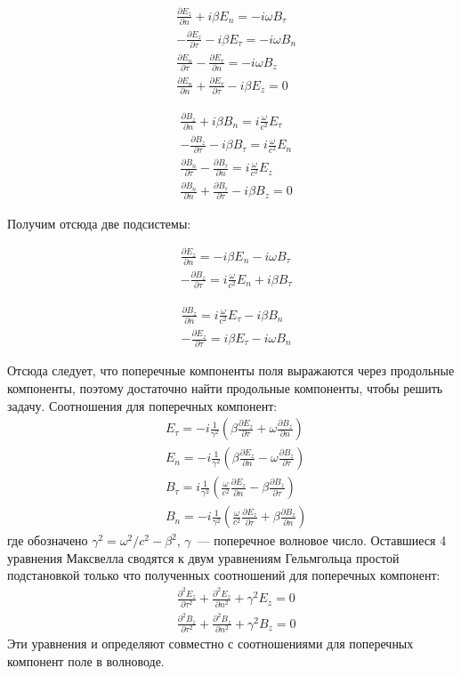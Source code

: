 \documentclass[a4paper,14pt]{extreport} %
\newcommand{\dff}[2]{\frac{\partial #1}{\partial #2}}
\newcommand{\dfs}[2]{\frac{\partial^2 #1}{\partial #2^2}}
\begin{document}
	\parbox{0.5\textwidth}{
		\begin{align*}
		& \dff{E_z}{n} + i \beta E_n = - i \omega B_\tau \\
		& - \dff{E_z}{\tau} - i \beta E_\tau = - i \omega B_n \\
		& \dff{E_n}{\tau} - \dff{E_\tau}{n} = - i \omega B_z \\
		& \dff{E_n}{n} + \dff{E_\tau}{\tau} - i \beta E_z = 0
		\end{align*}
	}\parbox{0.5\textwidth}{
		\begin{align*}
		& \dff{B_z}{n} + i \beta B_n = i \frac{\omega}{c^2} E_\tau \\
		& - \dff{B_z}{\tau} - i \beta B_\tau = i \frac{\omega}{c^2} E_n \\
		& \dff{B_n}{\tau} - \dff{B_\tau}{n} = i \frac{\omega}{c^2} E_z \\
		& \dff{B_n}{n} + \dff{B_\tau}{\tau} - i \beta B_z = 0
		\end{align*}
	}
	Получим отсюда две подсистемы:
	
	\parbox{0.5\textwidth}{
		\begin{align*}
		& \dff{E_z}{n} = - i \beta E_n - i \omega B_\tau \\
		& - \dff{B_z}{\tau} = i \frac{\omega}{c^2} E_n + i \beta B_\tau
		\end{align*}
	}\parbox{0.5\textwidth}{
		\begin{align*}
		& \dff{B_z}{n} = i \frac{\omega}{c^2} E_\tau - i \beta B_n\\
		& - \dff{E_z}{\tau} = i \beta E_\tau - i \omega B_n
		\end{align*}
	}
	Отсюда следует, что поперечные компоненты поля выражаются через продольные компоненты, поэтому достаточно найти продольные компоненты, чтобы решить задачу. Соотношения для поперечных компонент:
	\begin{align*}
		& {E}_\tau = - i \frac{1}{\gamma^2}\left(\beta\dff{E_z}{\tau} + \omega \dff{B_z}{n}\right) \\
		& {E}_n = - i \frac{1}{\gamma^2}\left(\beta\dff{E_z}{n} - \omega \dff{B_z}{\tau}\right) \\
		& {B}_\tau = i \frac{1}{\gamma^2}\left(\frac{\omega}{c^2} \dff{E_z}{n} - \beta\dff{B_z}{\tau}\right) \\
		& {B}_n = - i \frac{1}{\gamma^2}\left(\frac{\omega}{c^2}\dff{E_z}{\tau} + \beta \dff{B_z}{n}\right)
	\end{align*}
	где обозначено $\gamma^2 = \omega^2/c^2 - \beta^2$, $\gamma$~--- поперечное волновое число. Оставшиеся 4 уравнения Максвелла сводятся к двум уравнениям Гельмгольца простой подстановкой только что полученных соотношений для поперечных компонент:
	\begin{align*}
		& \dfs{E_z}{\tau} + \dfs{E_z}{n} + \gamma^2 E_z = 0 \\
		& \dfs{B_z}{\tau} + \dfs{B_z}{n} + \gamma^2 B_z = 0
	\end{align*}
	Эти уравнения и определяют совместно с соотношениями для поперечных компонент поле в волноводе.
	
\end{document}
